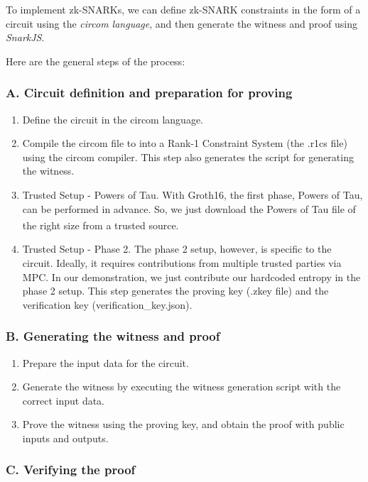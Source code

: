 \documentclass[
]{report}
\providecommand{\tightlist}{%
  \setlength{\itemsep}{0pt}\setlength{\parskip}{0pt}}
\begin{document}
To implement zk-SNARKs, we can define zk-SNARK constraints in the form
of a circuit using the \emph{circom language}, and then generate the
witness and proof using \emph{SnarkJS}.

Here are the general steps of the process:

\subsubsection*{A. Circuit definition and preparation for proving}

\begin{enumerate}
\def\labelenumi{\arabic{enumi}.}
\tightlist
\item
  Define the circuit in the circom language.
\item
  Compile the circom file to into a Rank-1 Constraint System (the .r1cs
  file) using the circom compiler. This step also generates the script
  for generating the witness.
\item
  Trusted Setup - Powers of Tau. With Groth16, the first phase, Powers
  of Tau, can be performed in advance. So, we just download the Powers
  of Tau file of the right size from a trusted source\textsuperscript{\cite{snarkjs}}.
\item
  Trusted Setup - Phase 2. The phase 2 setup, however, is specific to
  the circuit. Ideally, it requires contributions from multiple trusted
  parties via MPC. In our demonstration, we just contribute our
  hardcoded entropy in the phase 2 setup. This step generates the
  proving key (.zkey file) and the verification key
  (verification\_key.json).
\end{enumerate}

\subsubsection*{B. Generating the witness and proof}

\begin{enumerate}
\def\labelenumi{\arabic{enumi}.}
\tightlist
\item
  Prepare the input data for the circuit.
\item
  Generate the witness by executing the witness generation script with
  the correct input data.
\item
  Prove the witness using the proving key, and obtain the proof with
  public inputs and outputs.
\end{enumerate}

\subsubsection*{C. Verifying the proof}
\end{document}
